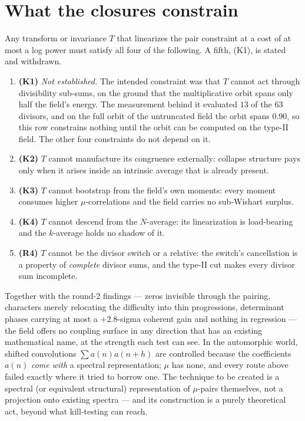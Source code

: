 \documentclass[11pt,a4paper]{article}
\theoremstyle{plain}
\theoremstyle{definition}
\begin{document}
\section{What the closures constrain}

Any transform or invariance $T$ that linearizes the pair constraint at
a cost of at most a log power must satisfy all four of the following.
A fifth, (K1), is stated and withdrawn.

\begin{enumerate}
\item \textbf{(K1)} \emph{Not established.} The intended constraint
  was that $T$ cannot act through divisibility sub-sums, on the
  ground that the multiplicative orbit spans only half the field's
  energy. The measurement behind it evaluated $13$ of the $63$
  divisors, and on the full orbit of the untruncated field the orbit
  spans $0.90$, so this row constrains nothing until the orbit can be
  computed on the type-II field. The other four constraints do not
  depend on it.
\item \textbf{(K2)} $T$ cannot manufacture its congruence externally:
  collapse structure pays only when it arises inside an intrinsic
  average that is already present.
\item \textbf{(K3)} $T$ cannot bootstrap from the field's own moments:
  every moment consumes higher $\mu$-correlations and the field
  carries no sub-Wishart surplus.
\item \textbf{(K4)} $T$ cannot descend from the $N$-average: its
  linearization is load-bearing and the $k$-average holds no shadow
  of it.
\item \textbf{(R4)} $T$ cannot be the divisor switch or a relative:
  the switch's cancellation is a property of \emph{complete} divisor
  sums, and the type-II cut makes every divisor sum incomplete.
\end{enumerate}

\noindent
Together with the round-2 findings --- zeros invisible through the
pairing, characters merely relocating the difficulty into thin
progressions, determinant phases carrying at most a $+2.8$-sigma
coherent gain and nothing in regression --- the field offers no
coupling surface in any direction that has an existing mathematical
name, at the strength each test can see. In the automorphic world, shifted convolutions
$\sum a(n)a(n+h)$ are controlled because the coefficients $a(n)$
\emph{come with} a spectral representation; $\mu$ has none, and every
route above failed exactly where it tried to borrow one. The technique
to be created is a spectral (or equivalent structural) representation
of $\mu$-pairs themselves, not a projection onto existing spectra ---
and its construction is a purely theoretical act, beyond what
kill-testing can reach.
\end{document}
